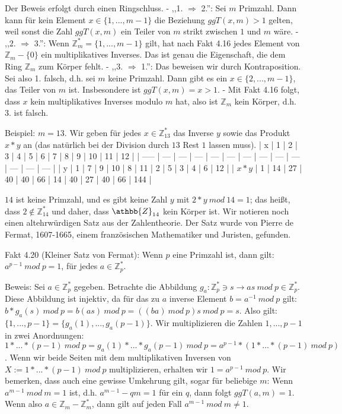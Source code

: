 \documentclass[a4paper]{article}
\begin{document}
\begin{multicols}{3}
Der Beweis erfolgt durch einen Ringschluss. 
- ,,1. $\Rightarrow$ 2.'': Sei $m$ Primzahl. Dann kann für kein Element $x\in\{1 ,...,m-1\}$ die Beziehung $ggT(x,m)>1$ gelten, weil sonst die Zahl $ggT(x,m)$ ein Teiler von $m$ strikt zwischen $1$ und $m$ wäre.
- ,,2. $\Rightarrow$ 3.'': Wenn $\mathbb{Z}^*_m=\{1 ,...,m-1\}$ gilt, hat nach Fakt 4.16 jedes Element von $\mathbb{Z}_m -\{0\}$ ein multiplikatives Inverses. Das ist genau die Eigenschaft, die dem Ring $\mathbb{Z}_m$ zum Körper fehlt.
- ,,3. $\Rightarrow$ 1.'': Das beweisen wir durch Kontraposition. Sei also 1. falsch, d.h. sei $m$ keine Primzahl. Dann gibt es ein $x\in\{2,...,m-1\}$, das Teiler von $m$ ist. Insbesondere ist $ggT(x,m) =x >1$. 
- Mit Fakt 4.16 folgt, dass $x$ kein multiplikatives Inverses modulo $m$ hat, also ist $\mathbb{Z}_m$ kein Körper, d.h. 3. ist falsch. 

Beispiel: $m=13$. Wir geben für jedes $x\in\mathbb{Z}^*_{13}$ das Inverse $y$ sowie das Produkt $x*y$ an (das natürlich bei der Division durch $13$ Rest $1$ lassen muss).
| x     | 1   | 2   | 3   | 4   | 5   | 6   | 7   | 8   | 9   | 10  | 11  | 12  |
| ----- | --- | --- | --- | --- | --- | --- | --- | --- | --- | --- | --- | --- |
| y     | 1   | 7   | 9   | 10  | 8   | 11  | 2   | 5   | 3   | 4   | 6   | 12  |
| $x*y$ | 1   | 14  | 27  | 40  | 40  | 66  | 14  | 40  | 27  | 40  | 66  | 144 |

$14$ ist keine Primzahl, und es gibt keine Zahl $y$ mit $2*y\ mod\ 14 = 1$; das heißt, dass $2\not\in\mathbb{Z}^*_{14}$ und daher, dass $\athbb{Z}_{14}$ kein Körper ist. 
Wir notieren noch einen altehrwürdigen Satz aus der Zahlentheorie. Der Satz wurde von Pierre de Fermat, 1607-1665, einem französischen Mathematiker und Juristen, gefunden.

Fakt 4.20 (Kleiner Satz von Fermat): Wenn $p$ eine Primzahl ist, dann gilt: $a^{p-1}\ mod\ p= 1$, für jedes $a\in\mathbb{Z}^*_p$.

Beweis: Sei $a\in\mathbb{Z}^*_p$ gegeben. Betrachte die Abbildung $g_a: \mathbb{Z}^*_p \owns s\rightarrow as\ mod\ p\in\mathbb{Z}^*_p$. Diese Abbildung ist injektiv, da für das zu $a$ inverse Element $b=a^{-1}\ mod\ p$ gilt: $b*g_a(s)\ mod\ p=b(as)\ mod\ p=((ba)\ mod\ p)s\ mod\ p=s$. Also gilt: $\{1,...,p-1\}=\{g_a(1),...,g_a(p-1)\}$.
Wir multiplizieren die Zahlen $1,...,p-1$ in zwei Anordnungen: $1*...*(p-1)\ mod\ p =g_a(1) *...*g_a(p-1)\ mod\ p=a^{p-1} *(1*...*(p-1)\ mod\ p)$.
Wenn wir beide Seiten mit dem multiplikativen Inversen von $X:= 1*...*(p-1)\ mod\ p$ multiplizieren, erhalten wir $1=a^{p-1}\ mod\ p$. 
Wir bemerken, dass auch eine gewisse Umkehrung gilt, sogar für beliebige $m$: Wenn $a^{m-1}\ mod\ m=1$ ist, d.h. $a^{m-1}-qm=1$ für ein $q$, dann folgt $ggT(a,m)=1$. Wenn also $a\in\mathbb{Z}_m -\mathbb{Z}^*_m$, dann gilt auf jeden Fall $a^{m-1}\ mod\ m\not= 1$.


\end{multicols}
\end{document}
